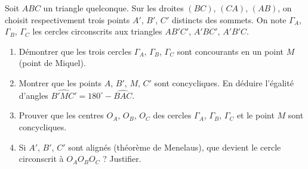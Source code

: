 \documentclass[11pt]{article}
\begin{document}
\begin{exercice}
Soit $ABC$ un triangle quelconque. Sur les droites $(BC)$, $(CA)$, $(AB)$, on choisit respectivement trois points $A'$, $B'$, $C'$ distincts des sommets. On note $\Gamma_A$, $\Gamma_B$, $\Gamma_C$ les cercles circonscrits aux triangles $AB'C'$, $A'BC'$, $A'B'C$.
\begin{enumerate}
    \item Démontrer que les trois cercles $\Gamma_A$, $\Gamma_B$, $\Gamma_C$ sont concourants en un point $M$ (point de Miquel).
    \item Montrer que les points $A$, $B'$, $M$, $C'$ sont concycliques. En déduire l'égalité d'angles $\widehat{B'MC'} = 180^\circ - \widehat{BAC}$.
    \item Prouver que les centres $O_A$, $O_B$, $O_C$ des cercles $\Gamma_A$, $\Gamma_B$, $\Gamma_C$ et le point $M$ sont concycliques.
    \item Si $A'$, $B'$, $C'$ sont alignés (théorème de Menelaus), que devient le cercle circonscrit à $O_AO_BO_C$ ? Justifier.
\end{enumerate}
\end{exercice}
\end{document}
